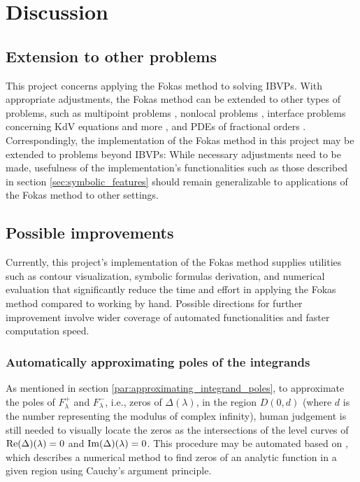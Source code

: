 \documentclass[12pt, oneside, a4paper]{article}
\begin{document}
\section{Discussion}\label{sec:discussion}

\subsection{Extension to other problems}

This project concerns applying the Fokas method to solving IBVPs. With appropriate adjustments, the Fokas method can be extended to other types of problems, such as multipoint problems \cite{Pelloni2018}, nonlocal problems \cite{Miller2018}, interface problems \cite{Deconinck2016} concerning KdV equations and more \cite{Shiels}, and PDEs of fractional orders \cite{Fernandez2018}. Correspondingly, the implementation of the Fokas method in this project may be extended to problems beyond IBVPs: While necessary adjustments need to be made, usefulness of the implementation's functionalities such as those described in section \ref{sec:symbolic_features} should remain generalizable to applications of the Fokas method to other settings.

\subsection{Possible improvements}

Currently, this project's implementation of the Fokas method \cite{Xiao} supplies utilities such as contour visualization, symbolic formulas derivation, and numerical evaluation that significantly reduce the time and effort in applying the Fokas method compared to working by hand. Possible directions for further improvement involve wider coverage of automated functionalities and faster computation speed.

\subsubsection{Automatically approximating poles of the integrands}

As mentioned in section \ref{par:approximating_integrand_poles}, to approximate the poles of $F^+_\lambda$ and $F^-_\lambda$, i.e., zeros of $\Delta(\lambda)$, in the region $D(0,d)$ (where $d$ is the number representing the modulus of complex infinity), human judgement is still needed to visually locate the zeros as the intersections of the level curves of $\mathrm{Re}(\Delta)(\lambda)=0$ and $\mathrm{Im}(\Delta)(\lambda)=0$. This procedure may be automated based on \cite{Delves1967}, which describes a numerical method to find zeros of an analytic function in a given region using Cauchy's argument principle.
\end{document}
